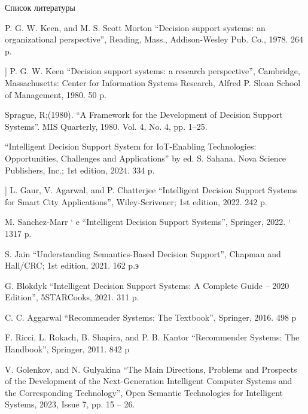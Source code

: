 \documentclass[10pt, a4paper]{article}
\begin{document}
\begin{multicols}{2}
\begin{center}

\caption{Список литературы}
\end{center}



\begin{enumerate}[label={[\arabic*]}]

     P. G. W. Keen, and M. S. Scott Morton “Decision support systems: an
organizational perspective”, Reading, Mass., Addison-Wesley Pub. Co.,
1978. 264 p.

     ] P. G. W. Keen “Decision support systems: a research perspective”,
Cambridge, Massachusetts: Center for Information Systems Research, Alfred
P. Sloan School of Management, 1980. 50 p.

   Sprague, R;(1980). “A Framework for the Development of Decision Support
Systems”. MIS Quarterly, 1980. Vol. 4, No. 4, pp. 1–25.

   “Intelligent Decision Support System for IoT-Enabling Technologies:
Opportunities, Challenges and Applications” by ed. S. Sahana. Nova Science
Publishers, Inc.; 1st edition, 2024. 334 p.

     ] L. Gaur, V. Agarwal, and P. Chatterjee “Intelligent Decision Support Systems
for Smart City Applications”, Wiley-Scrivener; 1st edition, 2022. 242 p.

   M. Sanchez-Marr ` e “Intelligent Decision Support Systems”, Springer, 2022. `
1317 p.

    S. Jain “Understanding Semantics-Based Decision Support”, Chapman and
Hall/CRC; 1st edition, 2021. 162 p.э

   G. Blokdyk “Intelligent Decision Support Systems: A Complete Guide –
2020 Edition”, 5STARCooks, 2021. 311 p.

    C. C. Aggarwal “Recommender Systems: The Textbook”, Springer, 2016.
498 p

    F. Ricci, L. Rokach, B. Shapira, and P. B. Kantor “Recommender Systems:
The Handbook”, Springer, 2011. 842 p

   V. Golenkov, and N. Gulyakina “The Main Directions, Problems and
Prospects of the Development of the Next-Generation Intelligent Computer
Systems and the Corresponding Technology”, Open Semantic Technologies
for Intelligent Systems, 2023, Issue 7, pp. 15 – 26.


\end{enumerate}
\end{multicols}
\end{document}

